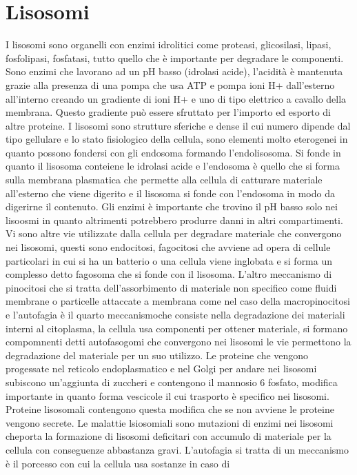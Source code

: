 \section{Lisosomi}
I lisosomi sono organelli con enzimi idrolitici come proteasi, glicosilasi, lipasi, fosfolipasi, fosfatasi, tutto quello che \`e importante per degradare le componenti. Sono enzimi che
lavorano ad un pH basso (idrolasi acide), l'acidit\`a \`e mantenuta grazie alla presenza di una pompa che usa ATP e pompa ioni H+ dall'esterno all'interno creando un gradiente di ioni
H+ e uno di tipo elettrico a cavallo della membrana. Questo gradiente pu\`o essere sfruttato per l'importo ed esporto di altre proteine. I lisosomi sono strutture sferiche e dense il cui
numero dipende dal tipo gellulare e lo stato fisiologico della cellula, sono elementi molto eterogenei in quanto possono fondersi con gli endosoma formando l'endolisosoma. Si fonde in 
quanto il lisosoma conteiene le idrolasi acide e l'endosoma \`e quello che si forma sulla membrana plasmatica che permette alla cellula di catturare materiale all'esterno che viene
digerito e il lisosoma si fonde con l'endosoma in modo da digerirne il contenuto. Gli enzimi \`e importante che trovino il pH basso solo nei lisoosmi in quanto altrimenti potrebbero 
produrre danni in altri compartimenti. Vi sono altre vie utilizzate dalla cellula per degradare materiale che convergono nei lisosomi, questi sono endocitosi, fagocitosi che avviene
ad opera di cellule particolari in cui si ha un batterio o una cellula viene inglobata e si forma un complesso detto fagosoma che si fonde con il lisosoma. L'altro meccanismo di 
pinocitosi che si tratta dell'assorbimento di materiale non specifico come fluidi membrane o particelle attaccate a membrana come nel caso della macropinocitosi e l'autofagia \`e il 
quarto meccanismoche consiste nella degradazione dei materiali interni al citoplasma, la cellula usa componenti per ottener materiale, si formano compomnenti detti autofasogomi che
convergono nei lisosomi le vie permettono la degradazione del materiale per un suo utilizzo. Le proteine che vengono progessate nel reticolo endoplasmatico e nel Golgi per andare nei
lisosomi subiscono un'aggiunta di zuccheri e contengono il mannosio 6 fosfato, modifica importante in quanto forma vescicole il cui trasporto \`e specifico nei lisosomi. Proteine 
lisosomali contengono questa modifica che se non avviene le proteine vengono secrete. Le malattie lsiosomiali sono mutazioni di enzimi nei lisosomi cheporta la formazione di lisosomi
deficitari con accumulo di materiale per la cellula con conseguenze abbastanza gravi. L'autofagia si tratta di un meccanismo \`e il porcesso con cui la cellula usa sostanze in caso di 
